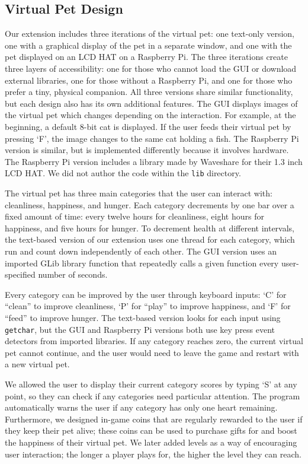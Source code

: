 \documentclass[11pt]{article}
\begin{document}
\subsection{Virtual Pet Design}

Our extension includes three iterations of the virtual pet: one text-only version, one with a graphical
display of the pet in a separate window, and one with the pet displayed on an LCD HAT on a Raspberry
Pi. The three iterations create three layers of accessibility: one for those who cannot load the GUI or 
download external libraries, one for those without a Raspberry Pi, and one for those who prefer a tiny, 
physical companion. All three versions share similar functionality, but each design also has its own
additional features. The GUI displays images of the virtual pet which changes depending on the 
interaction. For example, at the beginning, a default 8-bit cat is displayed. If the 
user feeds their virtual pet by pressing `F', the image changes to the same cat holding a fish. 
The Raspberry Pi version is similar, but is implemented differently because it involves hardware.
The Raspberry Pi version includes a library made by Waveshare for their 1.3 inch LCD HAT. We did not
author the code within the \texttt{lib} directory. 

The virtual pet has three main categories that the user can interact with: cleanliness, 
happiness, and hunger. Each category decrements by one bar over a fixed amount of time: every twelve 
hours for cleanliness, eight hours for happiness, and five hours for hunger. To decrement health 
at different intervals, the text-based version of our extension uses one thread for each category, 
which run and count down independently of each other. The GUI version uses an imported GLib library 
function that repeatedly calls a given function every user-specified number of seconds. 

Every category can be improved by the user through keyboard inputs: `C' for ``clean'' to 
improve cleanliness, `P' for ``play'' to improve happiness, and `F' for ``feed'' to improve hunger.
The text-based version looks for each input using \texttt{getchar}, but the GUI and Raspberry Pi 
versions both use key press event detectors from imported libraries. If any category reaches zero, 
the current virtual pet cannot continue, and the user would need to leave the game and restart 
with a new virtual pet. 

We allowed the user to display their current category scores by typing `S' at any point, so they 
can check if any categories need particular attention. The program automatically warns the user if any 
category has only one heart remaining. Furthermore, we designed in-game coins that are 
regularly rewarded to the user if they keep their pet alive; these coins can be used to 
purchase gifts for and boost the happiness of their virtual pet. We later added levels as a way 
of encouraging user interaction; the longer a player plays for, the higher the level they can reach.
\end{document}
